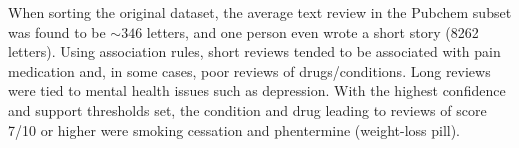 \documentclass[11pt]{article}
\begin{document}
When sorting the original dataset, the average text review in the Pubchem subset was found to be $\sim346$ letters, and one person even wrote a short story (8262 letters). Using association rules, short reviews tended to be associated with pain medication and, in some cases, poor reviews of drugs/conditions. Long reviews were tied to mental health issues such as depression. With the highest confidence and support thresholds set, the condition and drug leading to reviews of score 7/10 or higher were smoking cessation and phentermine (weight-loss pill).


















\printbibliography
\end{document}
